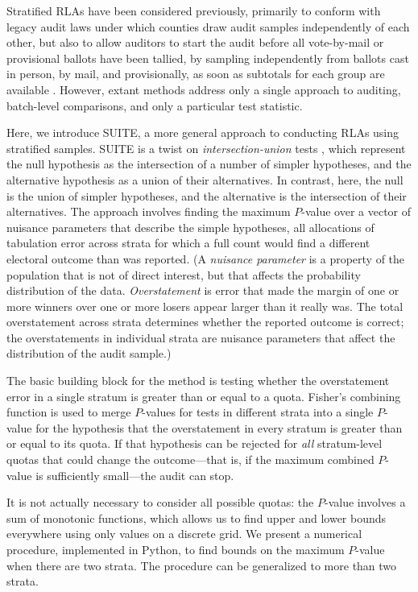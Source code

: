 \documentclass[runningheads]{llncs}
\begin{document}
Stratified RLAs have been considered previously, primarily to conform with legacy audit laws under which counties draw audit samples independently of each other, but also to allow auditors to start the audit before all vote-by-mail or provisional ballots have been tallied, by sampling independently from ballots cast in person, by mail, and provisionally, as soon as subtotals for each group are available \cite{stark08a,higginsEtal11}.
However, extant methods address only a single approach to auditing, batch-level comparisons, and only a particular test statistic.

Here, we introduce SUITE, a more general approach to conducting RLAs using stratified samples.
SUITE is a twist on \emph{intersection-union} tests \cite{pesarinSalmaso10}, which represent the null hypothesis
as the intersection of a number of simpler hypotheses, and the alternative hypothesis as a union of their alternatives.
In contrast, here, the null is the union of simpler hypotheses, and the alternative is the intersection of their alternatives.
The approach involves finding the maximum $P$-value over a vector of nuisance parameters that describe the simple hypotheses, 
all allocations of tabulation error across strata for which a full count would find a different electoral outcome than was reported.
(A \emph{nuisance parameter} is a property of the population that is not of direct interest, but that affects the probability distribution of the data. 
\emph{Overstatement} is error that made the margin of one or more winners over one or more losers appear larger than it really was.
The total overstatement across strata determines whether the reported outcome is correct; 
the overstatements in individual strata are nuisance parameters that affect the distribution of the audit sample.)

The basic building block for the method is testing whether the overstatement error in a single stratum is greater than or equal to a quota.
Fisher's combining function is used to merge $P$-values for tests in different strata into a single $P$-value for the hypothesis that the overstatement in every stratum is greater than or equal to its quota.
If that hypothesis can be rejected for \emph{all} stratum-level quotas that could change the outcome---that is, if the maximum combined $P$-value is sufficiently small---the audit can stop.

It is not actually necessary to consider all possible quotas: the $P$-value involves a sum of monotonic functions, which allows us to find upper and lower bounds everywhere using only values on a discrete grid.
We present a numerical procedure, implemented in Python,
to find bounds on the maximum $P$-value when there are two strata.
The procedure can be generalized to more than two strata.
\end{document}
